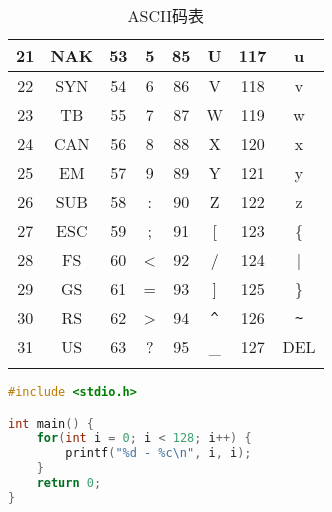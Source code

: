 \begin{longtable}{|c|c|c|c|c|c|c|c|}
	\hline
	21             & NAK           & 53             & 5             & 85             & U                      & 117            & u                      \\
	\hline
	22             & SYN           & 54             & 6             & 86             & V                      & 118            & v                      \\
	\hline
	23             & TB            & 55             & 7             & 87             & W                      & 119            & w                      \\
	\hline
	24             & CAN           & 56             & 8             & 88             & X                      & 120            & x                      \\
	\hline
	25             & EM            & 57             & 9             & 89             & Y                      & 121            & y                      \\
	\hline
	26             & SUB           & 58             & :             & 90             & Z                      & 122            & z                      \\
	\hline
	27             & ESC           & 59             & ;             & 91             & [                      & 123            & \{                     \\
			\hline
	28             & FS            & 60             & <             & 92             & /                      & 124            & |                      \\
			\hline
	29             & GS            & 61             & =             & 93             & ]                      & 125            & \}                     \\
	\hline
	30             & RS            & 62             & >             & 94             & \lstinline|^| & 126            & \lstinline|~| \\
	\hline
	31             & US            & 63             & ?             & 95             & \_                     & 127            & DEL                    \\
	\hline
	\caption{ASCII码表}
\end{longtable}


\begin{lstlisting}[language=C]
#include <stdio.h>

int main() {
	for(int i = 0; i < 128; i++) {
		printf("%d - %c\n", i, i);
	}
	return 0;
}
\end{lstlisting}

